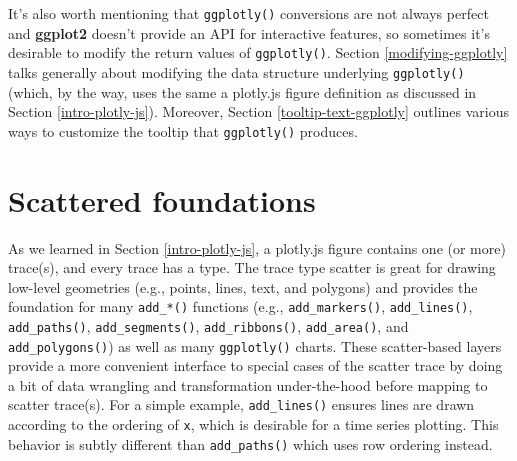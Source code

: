 \documentclass[
  12pt,
]{krantz}
\newenvironment{Shaded}{\begin{snugshade}}{\end{snugshade}}
\newcommand{\CommentTok}[1]{\textcolor[rgb]{0.56,0.35,0.01}{\textit{#1}}}
\newcommand{\DataTypeTok}[1]{\textcolor[rgb]{0.13,0.29,0.53}{#1}}
\newcommand{\KeywordTok}[1]{\textcolor[rgb]{0.13,0.29,0.53}{\textbf{#1}}}
\newcommand{\NormalTok}[1]{#1}
\newcommand{\OperatorTok}[1]{\textcolor[rgb]{0.81,0.36,0.00}{\textbf{#1}}}
\newcommand{\StringTok}[1]{\textcolor[rgb]{0.31,0.60,0.02}{#1}}
\begin{document}
It's also worth mentioning that \texttt{ggplotly()} conversions are not always perfect and \textbf{ggplot2} doesn't provide an API for interactive features, so sometimes it's desirable to modify the return values of \texttt{ggplotly()}. Section \ref{modifying-ggplotly} talks generally about modifying the data structure underlying \texttt{ggplotly()} (which, by the way, uses the same a plotly.js figure definition as discussed in Section \ref{intro-plotly-js}). Moreover, Section \ref{tooltip-text-ggplotly} outlines various ways to customize the tooltip that \texttt{ggplotly()} produces.

\hypertarget{scatter-traces}{%
\chapter{Scattered foundations}\label{scatter-traces}}

As we learned in Section \ref{intro-plotly-js}, a plotly.js figure contains one (or more) trace(s), and every trace has a type. The trace type scatter is great for drawing low-level geometries (e.g., points, lines, text, and polygons) and provides the foundation for many \texttt{add\_*()} functions (e.g., \texttt{add\_markers()}, \texttt{add\_lines()}, \texttt{add\_paths()}, \texttt{add\_segments()}, \texttt{add\_ribbons()}, \texttt{add\_area()}, and \texttt{add\_polygons()}) as well as many \texttt{ggplotly()} charts. These scatter-based layers provide a more convenient interface to special cases of the scatter trace by doing a bit of data wrangling and transformation under-the-hood before mapping to scatter trace(s). For a simple example, \texttt{add\_lines()} ensures lines are drawn according to the ordering of \texttt{x}, which is desirable for a time series plotting. This behavior is subtly different than \texttt{add\_paths()} which uses row ordering instead.

\begin{Shaded}
\end{Shaded}
\end{document}
